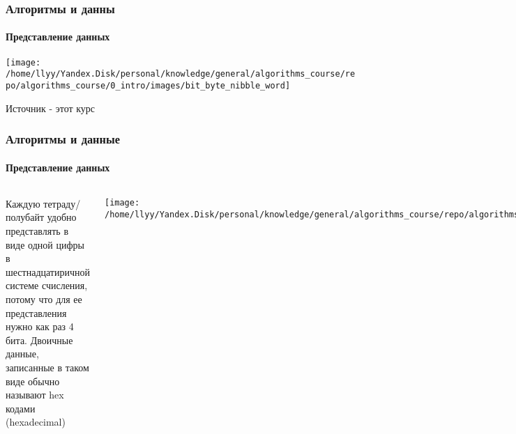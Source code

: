 \documentclass[aspectratio=169]{beamer}
\begin{document}
\begin{frame}
\frametitle{Алгоритмы и данны}
\framesubtitle{Представление данных}
\justifying
\small
\centering
\texttt{[image: /home/llyy/Yandex.Disk/personal/knowledge/general/algorithms\_course/repo/algorithms\_course/0\_intro/images/bit\_byte\_nibble\_word]}

\scriptsize Источник - этот курс

\end{frame}

\begin{frame}
\frametitle{Алгоритмы и данные}
\framesubtitle{Представление данных}
\justifying
\begin{block}{}
\begin{columns}[]
\column{\dimexpr\linewidth-40mm}
\justifying
\small
Каждую тетраду/полубайт удобно представлять в виде одной цифры в шестнадцатиричной системе счисления, потому что для ее представления 
нужно как раз 4 бита. Двоичные данные, записанные в таком виде обычно называют hex кодами (hexadecimal)\newline

\centering
\texttt{[image: /home/llyy/Yandex.Disk/personal/knowledge/general/algorithms\_course/repo/algorithms\_course/0\_intro/images/hex\_to\_bin\_conversion]}
\centering

\column{40mm}

\texttt{[image: /home/llyy/Yandex.Disk/personal/knowledge/general/algorithms\_course/repo/algorithms\_course/0\_intro/images/hex\_digits]}
\centering


\end{columns}
\end{block}


\end{frame}
\end{document}
